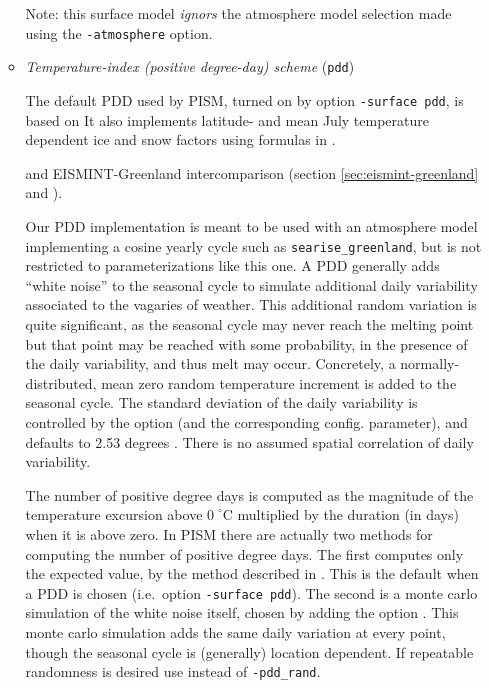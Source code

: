 \begin{enumerate}
\begin{itemize}
    Note: this surface model \emph{ignors} the atmosphere model selection made using the \texttt{-atmosphere} option.

  \item \emph{Temperature-index (positive degree-day) scheme} (\texttt{pdd})     

   The default PDD used by PISM, turned on by option \texttt{-surface pdd}, is based on \cite{CalovGreve05}  It also implements latitude- and mean July temperature dependent ice and snow factors using formulas in \cite{Faustoetal2009}.

and EISMINT-Greenland intercomparison (section \ref{sec:eismint-greenland} and \cite{RitzEISMINT}).

   Our PDD implementation is meant to be used with an atmosphere model implementing a cosine yearly cycle such as \texttt{searise_greenland}, but is not restricted to parameterizations like this one. A PDD generally adds ``white noise'' to the seasonal cycle to simulate additional daily variability associated to the vagaries of weather.  This additional random variation is quite significant, as the seasonal cycle may never reach the melting point but that point may be reached with some probability, in the presence of the daily variability, and thus melt may occur.  Concretely, a normally-distributed, mean zero random temperature increment is added to the seasonal cycle.  The standard deviation of the daily variability is controlled by the  option (and the corresponding config. parameter), and defaults to 2.53 degrees \cite{Faustoetal2009}. There is no assumed spatial correlation of daily variability.

The number of positive degree days is computed as the magnitude of the temperature excursion above $0\!\phantom{|}^\circ \text{C}$ multiplied by the duration (in days) when it is above zero.  In PISM there are actually two methods for computing the number of positive degree days.  The first computes only the expected value, by the method described in \cite{CalovGreve05}.  This is the default when a PDD is chosen (i.e.~option \texttt{-surface pdd}).  The second is a monte carlo simulation of the white noise itself, chosen by adding the option .  This monte carlo simulation adds the same daily variation at every point, though the seasonal cycle is (generally) location dependent.  If repeatable randomness is desired use  instead of \texttt{-pdd_rand}.


\end{itemize}
\end{enumerate}
